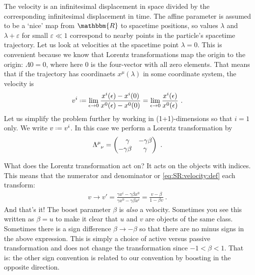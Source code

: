 The velocity is an infinitesimal displacement in space divided by the corresponding infinitesimal displacement in time. The affine parameter is assumed to be a `nice' map from $\mathbbm{R}$ to spacetime positions, so values $\lambda$ and $\lambda + \varepsilon$ for small $\varepsilon \ll 1$ correspond to nearby points in the particle's spacetime trajectory. Let us look at velocities at the spacetime point $\lambda = 0$. This is convenient because we know that Lorentz transformations map the origin to the origin: $\Lambda 0 = 0$, where here $0$ is the four-vector with all zero elements. That means that if the trajectory has coordinaets $x^\mu(\lambda)$ in some coordinate system, the velocity is
\begin{align}
    v^i \defeq 
    \lim_{\epsilon\to 0} \frac{x^i(\epsilon) - x^i(0)}{x^0(\epsilon)- x^0(0)} 
    =
    \lim_{\epsilon\to 0} \frac{x^i(\epsilon)}{x^0(\epsilon)}
    \ .
    \label{eq:SR:velocity:def}
\end{align}
Let us simplify the problem further by working in (1+1)-dimensions so that $i=1$ only. We write $v\defeq v^i$. In this case we perform a Lorentz transformation by
\begin{align}
    \Lambda\aij{\mu}{\nu} =
    \begin{pmatrix}
        \pp \gamma & -\gamma\beta \\
        -\gamma\beta & \gamma
    \end{pmatrix} \ .
\end{align}

What does the Lorentz transformation act on? It acts on the objects with indices. This means that the numerator and denominator or \eqref{eq:SR:velocity:def} each transform:
\begin{align}
    v \to v' =
    \frac{
        \gamma x^i - \gamma\beta x^0
    }{
        \gamma x^0 - \gamma\beta x^i
    }
    =
    \frac{
        v -\beta
    }{
        1 - \beta v
    } \ .
\end{align}
And that's it! The boost parameter $\beta$ is \emph{also} a velocity. Sometimes you see this written as $\beta = u$ to make it clear that $u$ and $v$ are objects of the same class. Sometimes there is a sign difference $\beta \to -\beta$ so that there are no minus signs in the above expression. This is simply a choice of active versus passive transformation and does not change the transformation since $-1 < \beta < 1$. That is: the other sign convention is related to our convention by boosting in the opposite direction.



